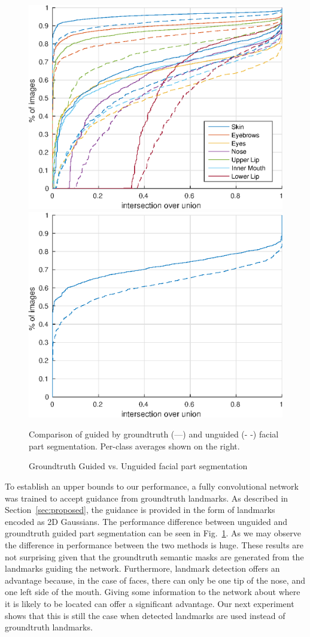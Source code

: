 \begin{figure}
\includegraphics[width=0.5\linewidth]{figs/gtguided-vs-unguided.eps}
\includegraphics[width=0.5\linewidth]{figs/gtguided-vs-unguided-mean.eps}
\caption{Groundtruth Guided vs. Unguided facial part
  segmentation}{Comparison of guided by groundtruth (---) and unguided
  (-{ }-) facial part segmentation. Per-class averages shown on the
  right.  }
\label{fig:gt-vs-un}
\end{figure}

To establish an upper bounds to our performance, a fully convolutional
network was trained to accept guidance from groundtruth landmarks. As
described in Section~\ref{sec:proposed}, the guidance is provided in
the form of landmarks encoded as 2D Gaussians. The performance
difference between unguided and groundtruth guided part segmentation
can be seen in Fig.~\ref{fig:gt-vs-un}. As we may observe the
difference in performance between the two methods is huge. These
results are not surprising given that the groundtruth semantic masks
are generated from the landmarks guiding the network. Furthermore,
landmark detection offers an advantage because, in the case of faces,
there can only be one tip of the nose, and one left side of the
mouth. Giving some information to the network about where it is likely
to be located can offer a significant advantage. Our next experiment
shows that this is still the case when detected landmarks are used
instead of groundtruth landmarks.



